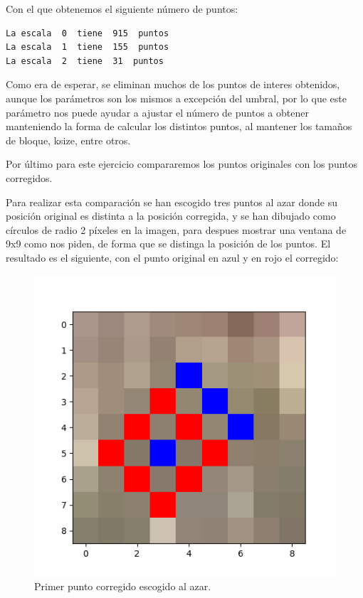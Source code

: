 \documentclass[12pt, spanish]{article}
\begin{document}
Con el que obtenemos el siguiente número de puntos:

\begin{lstlisting}
La escala  0  tiene  915  puntos
La escala  1  tiene  155  puntos
La escala  2  tiene  31  puntos
\end{lstlisting}

Como era de esperar, se eliminan muchos de los puntos de interes obtenidos, aunque los parámetros son los mismos a excepción del umbral, por lo que este parámetro nos puede ayudar a ajustar el número de puntos a obtener manteniendo la forma de calcular los distintos puntos, al mantener los tamaños de bloque, ksize, entre otros.



Por último para este ejercicio compararemos los puntos originales con los puntos corregidos.

Para realizar esta comparación se han escogido tres puntos al azar donde su posición original es distinta a la posición corregida, y se han dibujado como círculos de radio 2 píxeles en la imagen, para despues mostrar una ventana de 9x9 como nos piden, de forma que se distinga la posición de los puntos. El resultado es el siguiente, con el punto original en azul y en rojo el corregido:

\begin{figure}[H]
  \centering
      \includegraphics[width=\textwidth]{cmp_p1.png}
 		\caption{Primer punto corregido escogido al azar.}
\end{figure}
\end{document}
